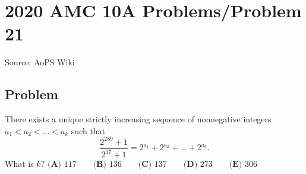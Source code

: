 \documentclass[12pt]{article}
\begin{document}
\section*{{2020 AMC 10A Problems/Problem 21}}
Source: AoPS Wiki

\subsection*{Problem}
There exists a unique strictly increasing sequence of nonnegative integers $a_1 < a_2 < … < a_k$ such that \[\frac{2^{289}+1}{2^{17}+1} = 2^{a_1} + 2^{a_2} + … + 2^{a_k}.\] What is $k?$ $\textbf{(A) } 117 \qquad \textbf{(B) } 136 \qquad \textbf{(C) } 137 \qquad \textbf{(D) } 273 \qquad \textbf{(E) } 306$
\end{document}
